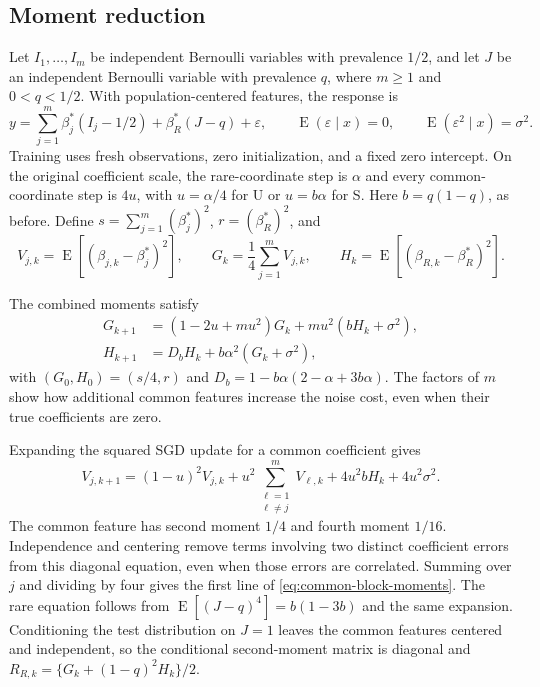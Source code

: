\documentclass{alt2027}
\DeclareMathOperator{\E}{E}
\begin{document}
\subsection{Moment reduction}

Let $I_1,\ldots,I_m$ be independent Bernoulli variables with prevalence $1/2$,
and let $J$ be an independent Bernoulli variable with prevalence $q$, where
$m \geq 1$ and $0 < q < 1/2$. With population-centered features, the response is
\[
  y = \sum_{j=1}^m\beta_j^*(I_j - 1/2)
      + \beta_R^*(J - q)
      + \varepsilon, \qquad \E(\varepsilon \mid x)
    = 0, \qquad \E(\varepsilon^2 \mid x)
    = \sigma^2.
\]
Training uses fresh observations, zero initialization, and a fixed zero
intercept. On the original coefficient scale, the rare-coordinate step is
$\alpha$ and every common-coordinate step is $4u$, with $u = \alpha/4$ for U or
$u = b\alpha$ for S. Here $b = q(1 - q)$, as before. Define
$s = \sum_{j=1}^m(\beta_j^*)^2$, $r = (\beta_R^*)^2$, and
\[
  V_{j,k} = \E[(\beta_{j,k} - \beta_j^*)^2],\qquad G_k
          = \frac14\sum_{j=1}^m V_{j,k},\qquad H_k
          = \E[(\beta_{R,k} - \beta_R^*)^2].
\]

The combined moments satisfy
\begin{equation}
  \begin{aligned}
    G_{k+1} & = (1 - 2u + mu^2)G_k + mu^2(bH_k + \sigma^2), \\
    H_{k+1} & = D_bH_k + b\alpha^2(G_k + \sigma^2),
  \end{aligned} \label{eq:common-block-moments}
\end{equation}
with $(G_0,H_0) = (s/4,r)$ and $D_b = 1 - b\alpha(2 - \alpha + 3b\alpha)$. The
factors of $m$ show how additional common features increase the noise cost, even
when their true coefficients are zero.

Expanding the squared SGD update for a common coefficient gives
\[
  V_{j,k+1} = (1 - u)^2V_{j,k}
              + u^2\sum_{\substack{\ell=1\\\ell\ne j}}^m V_{\ell,k}
              + 4u^2bH_k
              + 4u^2\sigma^2.
\]
The common feature has second moment $1/4$ and fourth moment $1/16$.
Independence and centering remove terms involving two distinct coefficient
errors from this diagonal equation, even when those errors are correlated.
Summing over $j$ and dividing by four gives the first line of
\cref{eq:common-block-moments}. The rare equation follows from
$\E[(J - q)^4] = b(1 - 3b)$ and the same expansion. Conditioning the test
distribution on $J = 1$ leaves the common features centered and independent, so
the conditional second-moment matrix is diagonal and
$R_{R,k} = \{G_k + (1 - q)^2H_k\}/2$.
\end{document}
